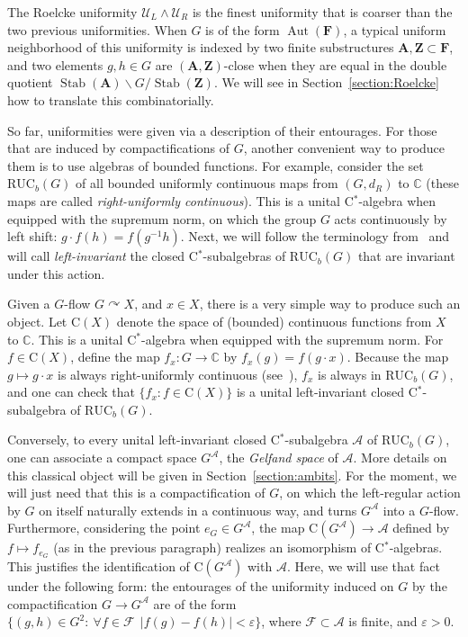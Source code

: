 \documentclass[11pt]{article}
\theoremstyle{definition}
\numberwithin{equation}{section}
\numberwithin{figure}{section}
\numberwithin{table}{section}
\newcommand{\A}{\mathcal A}
\newcommand{\CC}{\mathbb{C}}
\newcommand*{\mA}{\mathbf{A}}
\newcommand*{\mF}{\mathbf{F}}
\newcommand*{\mZ}{\mathbf{Z}}
\newcommand{\e}{\varepsilon}
\DeclareMathOperator{\Aut}{Aut}
\DeclareMathOperator{\Stab}{Stab}
\newcommand{\actson}{\curvearrowright}
\newcommand{\RUCB}{\mathrm{RUC}_{b}}
\let\oldforall\forall
\renewcommand*{\forall}{\mathrel{\oldforall}}
\begin{document}
The Roelcke uniformity $\mathcal U_{L}\wedge\mathcal U_{R}$ is the finest uniformity that is coarser than the two previous uniformities. When $G$ is of the form $\Aut(\mF)$, a typical uniform neighborhood of this uniformity is indexed by two finite substructures $\mA, \mZ \subset \mF$, and two elements $g,h\in G$ are $(\mA,\mZ)$-close when they are equal in the double quotient $\Stab(\mA)\backslash G / \Stab(\mZ)$. We will see in Section~\ref{section:Roelcke} how to translate this combinatorially.

So far, uniformities were given via a description of their entourages. For those that are induced by compactifications of $G$, another convenient way to produce them is to use algebras of bounded functions. For example, consider the set $\RUCB(G)$ of all bounded uniformly continuous maps from $(G,d_{R})$ to $\CC$ (these maps are called \emph{right-uniformly continuous}). This is a unital C$^{*}$-algebra when equipped with the supremum norm, on which the group $G$ acts continuously by left shift: $g\cdot f(h)=f(g^{-1}h)$. Next, we will follow the terminology from~\cite[Chapter~IV, Section~5]{dV} and will call \emph{left-invariant} the closed C$^{*}$-subalgebras of $\RUCB(G)$ that are invariant under this action.

Given a $G$-flow $G\actson X$, and $x\in X$, there is a very simple way to produce such an object. Let $\mathrm C(X)$ denote the space of (bounded) continuous functions from $X$ to $\CC$. This is a unital C$^{*}$-algebra when equipped with the supremum norm. For $f\in \mathrm C(X)$, define the map $f_{x}:G\rightarrow \CC$ by $f_{x}(g)=f(g\cdot x)$. Because the map $g\mapsto g\cdot x$ is always right-uniformly continuous (see~\cite[Lemma~2.15]{Pe}), $f_{x}$ is always in $\RUCB(G)$, and one can check that $\{ f_{x} : f\in \mathrm C(X)\}$ is a unital left-invariant closed C$^{*}$-subalgebra of $\RUCB(G)$.

Conversely, to every unital left-invariant closed C$^{*}$-subalgebra $\A$ of $\RUCB(G)$, one can associate a compact space $G^{\A}$, the \emph{Gelfand space} of $\A$. More details on this classical object will be given in Section~\ref{section:ambits}. For the moment, we will just need that this is a compactification of $G$, on which the left-regular action by $G$ on itself naturally extends in a continuous way, and turns $G^{\A}$ into a $G$-flow. Furthermore, considering the point $e_{G}\in G^{\A}$, the map $\mathrm C(G^{\A})\to\A$ defined by $f\mapsto f_{e_{G}}$ (as in the previous paragraph) realizes an isomorphism of C$^{*}$-algebras. This justifies the identification of $\mathrm C(G^{\A})$ with $\A$. Here, we will use that fact under the following form: the entourages of the uniformity induced on $G$ by the compactification $G\to G^{\A}$ are of the form $\{ (g,h) \in G^{2} :\: \forall f\in \mathcal F \ \ |f(g)-f(h)|<\e\}$, where $\mathcal F\subset \A$ is finite, and $\e >0$.
\end{document}
